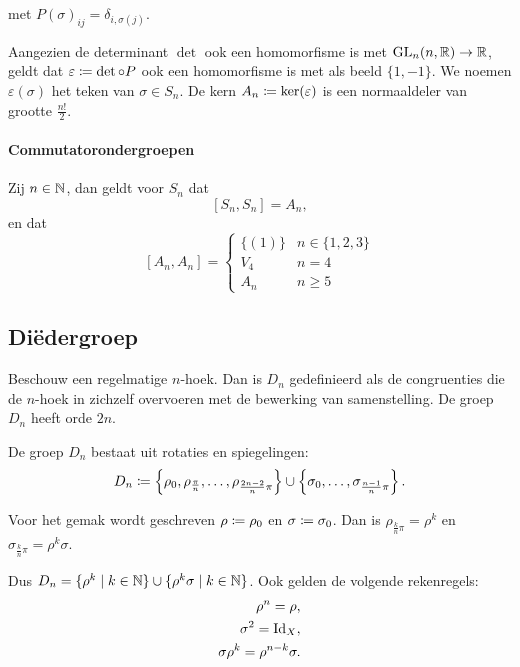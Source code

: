 met \(P(\sigma)_{ij}=\delta_{i,\sigma(j)}\).

Aangezien de determinant \(\det\) ook een homomorfisme is met \(\text{GL}_{n}(n,\mathbb{R})\to\mathbb{R}\), geldt dat \(\varepsilon\coloneqq\det\circ P\) ook een homomorfisme is met als beeld \(\{1,-1\}\). We noemen \(\varepsilon(\sigma)\) het teken van \(\sigma\in S_{n}\). De kern \(A_{n}\coloneqq\ker(\varepsilon)\) is een normaaldeler van grootte \(\frac{n!}{2}\).

\paragraph{Commutatorondergroepen} Zij \(n\in\mathbb{N}\), dan geldt voor \(S_{n}\) dat
\[
    [S_{n},S_{n}]=A_{n},
\]
en dat
\[
    [A_{n},A_{n}]=\begin{cases}
        \{(1)\} & n\in\{1,2,3\} \\
        V_{4}   & n=4           \\
        A_{n}   & n\geq5
    \end{cases}
\]

\subsection{Diëdergroep}
Beschouw een regelmatige \(n\)-hoek. Dan is \(D_{n}\) gedefinieerd als de congruenties die de \(n\)-hoek in zichzelf overvoeren met de bewerking van samenstelling. De groep \(D_{n}\) heeft orde \(2n\).

De groep \(D_{n}\) bestaat uit rotaties en spiegelingen:
\[
    D_{n}\coloneqq\left\{\rho_{0},\rho_{\frac{\pi}{n}},\dots,\rho_{\frac{2n-2}{n}\pi}\right\}\cup\left\{\sigma_{0},\dots,\sigma_{\frac{n-1}{n}\pi}\right\}.
\]

Voor het gemak wordt geschreven \(\rho\coloneqq\rho_{0}\) en \(\sigma\coloneqq\sigma_{0}\). Dan is \(\rho_{\frac{k}{n}\pi}=\rho^{k}\) en \(\sigma_{\frac{k}{n}\pi}=\rho^{k}\sigma\).

Dus \(D_{n}=\{\rho^{k}\mid k\in\mathbb{N}\}\cup\{\rho^{k}\sigma\mid k\in\mathbb{N}\}\). Ook gelden de volgende rekenregels:
\begin{align*}
    \rho^{n}=\rho,                   \\
    \sigma^{2}=\operatorname{Id}_{X},              \\
    \sigma\rho^{k}=\rho^{n-k}\sigma. \\
\end{align*}


